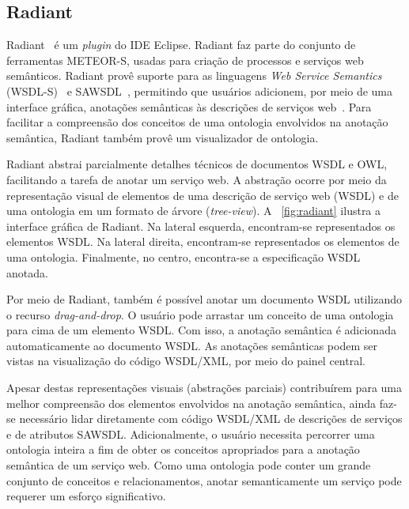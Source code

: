 \subsection{Radiant}\label{2-fundamentacao-ferramentas-radiant}

Radiant~\cite{MILLER-VERMA-GOMADAM-SHETH-BREWER-2005-Radiant} é um \textit{plugin} do IDE Eclipse. Radiant faz parte do conjunto de ferramentas METEOR-S, usadas para criação de processos e serviços web semânticos. Radiant provê suporte para as linguagens \textit{Web Service Semantics} (WSDL-S)~\cite{W3C-2005-WSDL-S} e SAWSDL~\cite{W3C-2007-SAWSDL}, permitindo que usuários adicionem, por meio de uma interface gráfica, anotações semânticas às descrições de serviços web~\cite{MILLER-VERMA-GOMADAM-SHETH-BREWER-2005-Radiant}. Para facilitar a compreensão dos conceitos de uma ontologia envolvidos na anotação semântica, Radiant também provê um visualizador de ontologia.

Radiant abstrai parcialmente detalhes técnicos de documentos WSDL e OWL, facilitando a tarefa de anotar um serviço web. A abstração ocorre por meio da representação visual de elementos de uma descrição de serviço web (WSDL) e de uma ontologia em um formato de árvore (\textit{tree-view}). A \figurename~\ref{fig:radiant} ilustra a interface gráfica de Radiant. Na lateral esquerda, encontram-se representados os elementos WSDL. Na lateral direita, encontram-se representados os elementos de uma ontologia. Finalmente, no centro, encontra-se a especificação WSDL anotada.

Por meio de Radiant, também é possível anotar um documento WSDL utilizando o recurso \textit{drag-and-drop}. O usuário pode arrastar um conceito de uma ontologia para cima de um elemento WSDL. Com isso, a anotação semântica é adicionada automaticamente ao documento WSDL. As anotações semânticas podem ser vistas na visualização do código WSDL/XML, por meio do painel central.

Apesar destas representações visuais (abstrações parciais) contribuírem para uma melhor compreensão dos elementos envolvidos na anotação semântica, ainda faz-se necessário lidar diretamente com código WSDL/XML de descrições de serviços e de atributos SAWSDL. Adicionalmente, o usuário necessita percorrer uma ontologia inteira a fim de obter os conceitos apropriados para a anotação semântica de um serviço web. Como uma ontologia pode conter um grande conjunto de conceitos e relacionamentos, anotar semanticamente um serviço pode requerer um esforço significativo.

